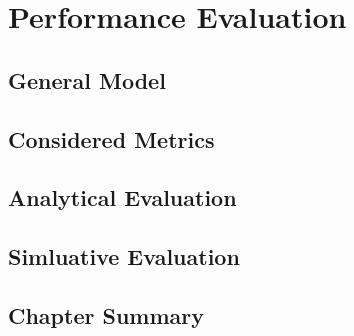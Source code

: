 
\cleardoublepage\chapter{Performance Evaluation}\minitoc\label{sec:evaluation}\vspace{.5cm}
\noindent\lipsum[7]

\section{General Model}\label{sec:model}
\lipsum[5]

\section{Considered Metrics}\label{sec:metrics}
\lipsum[5]

\section{Analytical Evaluation}\label{sec:analytic}
\lipsum[5]

\section{Simluative Evaluation}\label{sec:sim}
\lipsum[5]

\section{Chapter Summary}\label{sec:result}
\lipsum[5]

